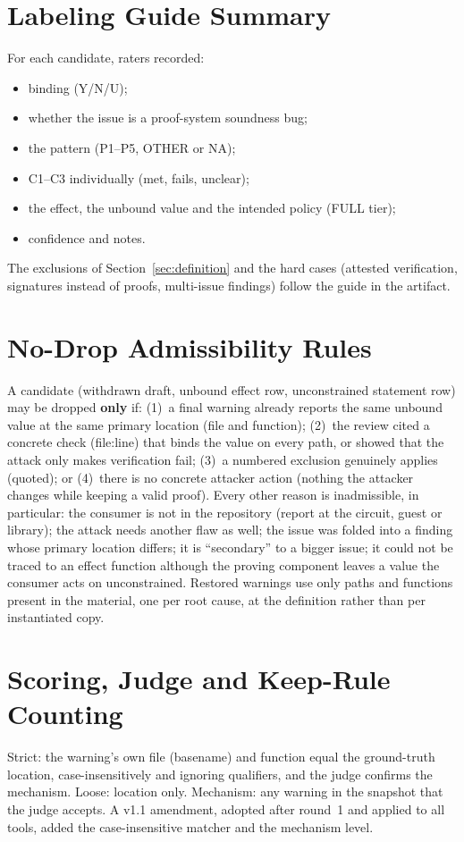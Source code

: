 \section{Labeling Guide Summary}\label{app:labels}
For each candidate, raters recorded:
\begin{itemize}
\item binding (Y/N/U);
\item whether the issue is a proof-system soundness bug;
\item the pattern (P1--P5, OTHER or NA);
\item C1--C3 individually (met, fails, unclear);
\item the effect, the unbound value and the intended policy (FULL tier);
\item confidence and notes.
\end{itemize}
The exclusions of Section~\ref{sec:definition} and the hard cases (attested
verification, signatures instead of proofs, multi-issue findings) follow the
guide in the artifact.

\section{No-Drop Admissibility Rules}\label{app:nodrop}
A candidate (withdrawn draft, unbound effect row, unconstrained statement row)
may be dropped \textbf{only} if: (1)~a final warning already reports the same
unbound value at the same primary location (file and function); (2)~the
review cited a concrete check (file:line) that binds the value on every path,
or showed that the attack only makes verification fail; (3)~a numbered
exclusion genuinely applies (quoted); or (4)~there is no concrete attacker
action (nothing the attacker changes while keeping a valid proof). Every other
reason is inadmissible, in particular: the consumer is not in the repository
(report at the circuit, guest or library); the attack needs another flaw as
well; the issue was folded into a finding whose primary location differs; it
is ``secondary'' to a bigger issue; it could not be traced to an effect
function although the proving component leaves a value the consumer acts on
unconstrained. Restored warnings use only paths and functions present in the
material, one per root cause, at the definition rather than per instantiated
copy.

\section{Scoring, Judge and Keep-Rule Counting}\label{app:count}
Strict: the warning's own file (basename) and function equal the ground-truth
location, case-insensitively and ignoring qualifiers, and the judge confirms
the mechanism. Loose: location only. Mechanism: any warning in the snapshot
that the judge accepts. A v1.1 amendment, adopted after round~1 and applied to
all tools, added the case-insensitive matcher and the mechanism level.


